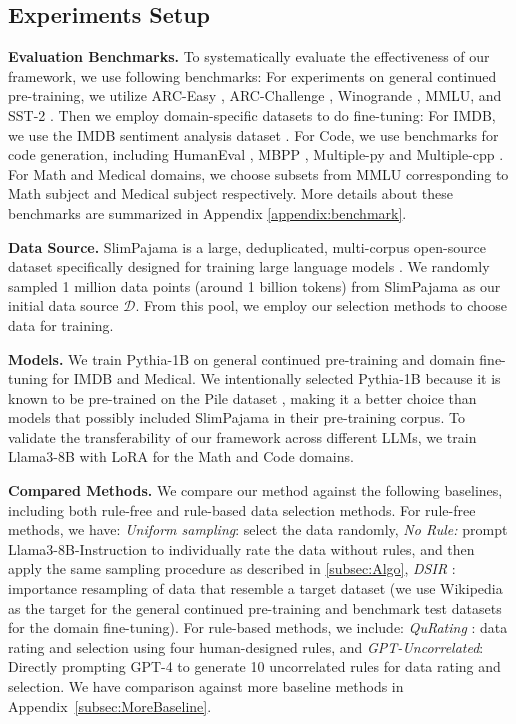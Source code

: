 \documentclass{article}
\begin{document}
\subsection{Experiments Setup}
\textbf{Evaluation Benchmarks.} To systematically evaluate the effectiveness of our framework, we use following benchmarks: For experiments on general continued pre-training, we utilize ARC-Easy \citep{yadav2019quick}, ARC-Challenge \citep{yadav2019quick}, Winogrande \citep{sakaguchi2021winogrande}, MMLU\citep{hendrycks2020measuring}, and SST-2 \citep{socher-etal-2013-recursive}. Then we employ domain-specific datasets to do fine-tuning: For IMDB, we use the IMDB sentiment analysis dataset \citep{maas-EtAl:2011:ACL-HLT2011}. For Code, we use benchmarks for code generation, including HumanEval \citep{chen2021evaluating}, MBPP \citep{austin2021program}, Multiple-py and Multiple-cpp \citep{cassano2022multipl}. For Math and Medical domains, we choose subsets from MMLU corresponding to Math subject and Medical subject respectively. More details about these benchmarks are summarized in Appendix \ref{appendix:benchmark}.


\textbf{Data Source.}
SlimPajama is a large, deduplicated, multi-corpus open-source dataset specifically designed for training large language models \citep{CerebrasSlimPajama2023}. We randomly sampled 1 million data points (around 1 billion tokens) from SlimPajama as our initial data source $\mathcal{D}$. From this pool, we employ our selection methods to choose data for training.


\textbf{Models.}
We train Pythia-1B \citep{biderman2023pythia} on general continued pre-training and domain fine-tuning for IMDB and Medical. We intentionally selected Pythia-1B because it is known to be pre-trained on the Pile dataset \citep{gao2020pile}, making it a better choice than models that possibly included SlimPajama in their pre-training corpus. To validate the transferability of our framework across different LLMs, we train Llama3-8B \citep{llama3modelcard} with LoRA \citep{hu2021lora} for the Math and Code domains.

\textbf{Compared Methods.} We compare our method against the following baselines, including both rule-free and rule-based data selection methods. For rule-free methods, we have: \textit{Uniform sampling}: select the data randomly, \textit{No Rule:} prompt Llama3-8B-Instruction to individually rate the data without rules, and then apply the same sampling procedure as described in \ref{subsec:Algo}, \textit{DSIR} \citep{xie2024data}: importance resampling of data that resemble a target dataset (we use Wikipedia as the target for the general continued pre-training and benchmark test datasets for the domain fine-tuning). For rule-based methods, we include: \textit{QuRating} \citep{wettig2024qurating}: data rating and selection using four human-designed rules, and \textit{GPT-Uncorrelated}: Directly prompting GPT-4 to generate 10 uncorrelated rules for data rating and selection. We have comparison against more baseline methods in Appendix~\ref{subsec:MoreBaseline}.
\end{document}
